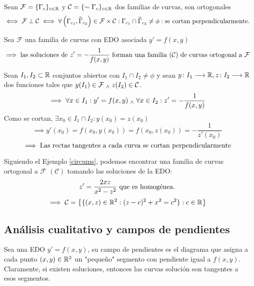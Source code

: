 \begin{defn}
	Sean $\mathcal{F}=\{\Gamma_c\}_{c\in \mathbb{R}}$ y $\mathcal{C}=\{\sim{\Gamma_c}\}_{c\in \mathbb{R}}$ dos familias de curvas, son ortogonales
	\[\iff \mathcal{F} \perp \mathcal{C}\iff \forall \left(\Gamma_{c_1}, \widetilde{\Gamma}_{c_2}\right) \in \mathcal{F}\times\mathcal{C}: \Gamma_{c_1}\cap\widetilde{\Gamma}_{c_2}\ne \phi : \text{se cortan perpendicularmente.}\]
\end{defn}

\begin{prop}
	Sea $\mathcal{F}$ una familia de curvas con EDO asociada $y'=f(x,y)$
	\[\implies \text{las soluciones de } z'=-\frac{1}{f(x,y)} \text{ forman una familia $(\mathcal{C})$ de curvas ortogonal a } \mathcal{F}\]
	\begin{dem}
		Sean $I_1, I_2 \subset \mathbb{R}$ conjuntos abiertos con $I_1\cap I_2\ne \phi$ y sean $y \colon I_1 \longrightarrow \mathbb{R}, z \colon I_2 \longrightarrow \mathbb{R}$ dos funciones tales que $y(I_1)\in \mathcal{F} \; _{\wedge} \; z(I_2)\in \mathcal{C}$.
		\[\implies \forall x\in I_1 : y'=f(x,y) \; _{\wedge} \; \forall x\in I_2 : z'=-\frac{1}{f(x,y)}\]
		Como se cortan, $\exists x_0\in I_1\cap I_2 : y(x_0)=z(x_0)$
		\[\implies y'(x_0)=f(x_0, y(x_0))=f(x_0, z(x_0))=-\frac{1}{z'(x_0)}\]
		\[\implies \text{Las rectas tangentes a cada curva se cortan perpendicularmente}\]
	\end{dem}
\end{prop}

\begin{ejem}
	Siguiendo el Ejemplo \ref{circums}, podemos encontrar una familia de curvas ortogonal a $\mathcal{F}$ $(\mathcal{C})$ tomando las soluciones de la EDO:
	\[\displaystyle z'=\frac{2xz}{x^2-z^2} \text{ que es homogénea.}\]
	\[\implies \mathcal{C} =\left\{\{(x,z)\in \mathbb{R}^2 : (z-c)^2+x^2=c^2\} : c\in\mathbb{R}\right\}\]
	\begin{figure}[htbp]
		\centering
		\vspace{-0.7cm} %
		
		\vspace{-0.2cm} %
	\end{figure}
\end{ejem}

\subsection{Análisis cualitativo y campos de pendientes}
\begin{defn}
	Sea una EDO $y'=f(x,y)$, su campo de pendientes es el diagrama que asigna a cada punto $(x,y)\in \mathbb{R}^2$ un "pequeño" segmento con pendiente igual a $f(x,y)$. Claramente, si existen soluciones, entonces las curvas solución son tangentes a esos segmentos.
\end{defn}

